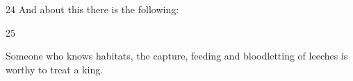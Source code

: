 \begin{translation}

\item[24]
And about this there is the following:
\begin{sloka}
\end{sloka}

\item[25]

\begin{sloka}
    Someone who knows habitats, the capture, feeding and bloodletting of
leeches is worthy to treat a king.
\end{sloka}

\end{translation}



